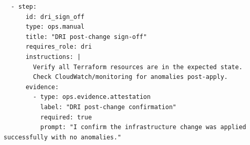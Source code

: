 \begin{verbatim}
  - step:
      id: dri_sign_off
      type: ops.manual
      title: "DRI post-change sign-off"
      requires_role: dri
      instructions: |
        Verify all Terraform resources are in the expected state.
        Check CloudWatch/monitoring for anomalies post-apply.
      evidence:
        - type: ops.evidence.attestation
          label: "DRI post-change confirmation"
          required: true
          prompt: "I confirm the infrastructure change was applied successfully with no anomalies."
\end{verbatim}
